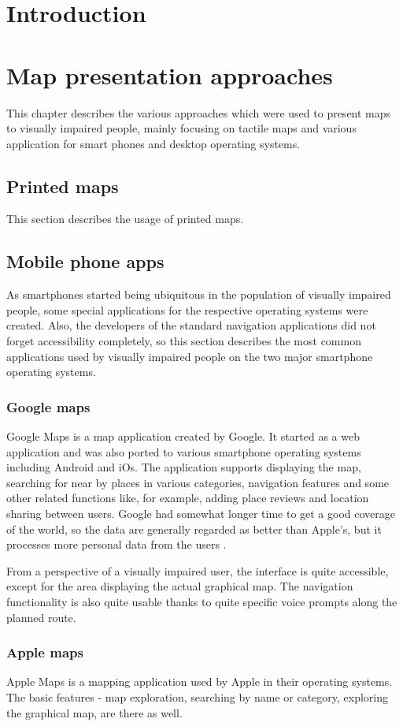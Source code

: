 \documentclass[nolof,digital]{fithesis3}
\begin{document}
\chapter{Introduction}
\chapter{Map presentation approaches}
This chapter describes the various approaches which were used to present maps to visually impaired people, mainly focusing on tactile maps and various application for smart phones and desktop operating systems.
\section{Printed maps}
This section describes the usage of printed maps.
\section{Mobile phone apps}
As smartphones started being ubiquitous in the population of visually impaired people, some special applications for the respective operating systems were created. Also, the developers of the standard navigation applications did not forget accessibility completely, so this section describes the most common applications used by visually impaired people on the two major smartphone operating systems.
\subsection{Google maps}
Google Maps \parencite{googlemaps} is a map application created by Google. It started as a web application and was also ported to various smartphone operating systems including Android and iOs. The application supports displaying the map, searching for near by places in various categories, navigation features and some other related functions like, for example, adding place reviews and location sharing between users. Google had somewhat longer time to get a good coverage of the world, so the data are generally regarded as better than Apple's, but it processes more personal data from the users \parencite{mapcomp}.

From a perspective of a visually impaired user, the interface is quite accessible, except for the area displaying the actual graphical map. The navigation functionality is also quite usable thanks to quite specific voice prompts along the planned route.
\subsection{Apple maps}
Apple Maps \parencite{applemaps} is a mapping application used by Apple in their operating systems. The basic features - map exploration, searching by name or category, exploring the graphical map, are there as well.
\end{document}
